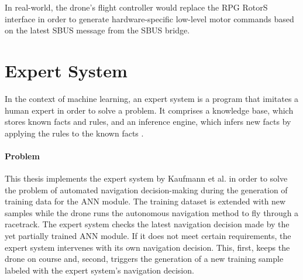 In real-world, the drone's flight controller would replace the 
RPG RotorS interface in order to generate hardware-specific low-level
motor commands based on the latest SBUS message from the SBUS bridge.








\section{Expert System} \label{sec:expert_system}

In the context of machine learning, 
an expert system is a program that imitates a human expert
in order to solve a problem. 
It comprises a knowledge base,
which stores known facts and rules, and an
inference engine, which infers new facts 
by applying the rules to the known facts \cite{osti_5675197}.

\paragraph*{Problem} $\ $\\
This thesis implements the expert system 
by Kaufmann et al. \cite{Kaufmann2018}
in order to solve the problem of automated navigation decision-making
during the generation of training data for the ANN module.
The training dataset is extended with new samples 
while the drone runs the autonomous navigation method to fly through a racetrack.
The expert system checks the latest navigation decision 
made by the yet partially trained ANN module.
If it does not meet certain requirements,
the expert system intervenes with its own navigation decision.
This, first, keeps the drone on course and, second,
triggers the generation of a new training sample labeled 
with the expert system's navigation decision.

